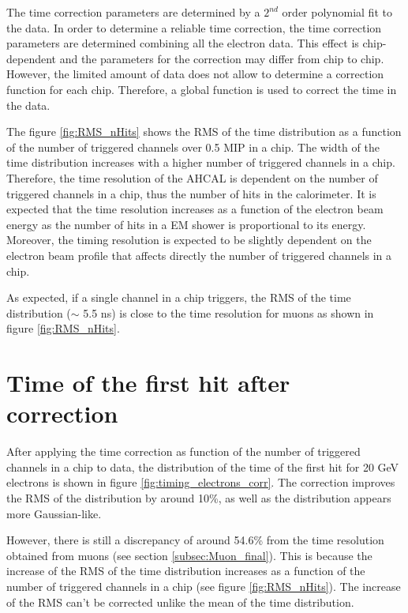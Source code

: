 The time correction parameters are determined by a $2^{nd}$ order polynomial fit to the data. In order to determine a reliable time correction, the time correction parameters are determined combining all the electron data. This effect is chip-dependent and the parameters for the correction may differ from chip to chip. However, the limited amount of data does not allow to determine a correction function for each chip. Therefore, a global function is used to correct the time in the data.

The figure \ref{fig:RMS_nHits} shows the RMS of the time distribution as a function of the number of triggered channels over 0.5 MIP in a chip. The width of the time distribution increases with a higher number of triggered channels in a chip. Therefore, the time resolution of the AHCAL is dependent on the number of triggered channels in a chip, thus the number of hits in the calorimeter. It is expected that the time resolution increases as a function of the electron beam energy as the number of hits in a EM shower is proportional to its energy. Moreover, the timing resolution is expected to be slightly dependent on the electron beam profile that affects directly the number of triggered channels in a chip.

As expected, if a single channel in a chip triggers, the RMS of the time distribution ($\sim$ 5.5 ns) is close to the time resolution for muons as shown in figure \ref{fig:RMS_nHits}.

\section{Time of the first hit after correction}
\label{subsec:Electron_Final}

After applying the time correction as function of the number of triggered channels in a chip to data, the distribution of the time of the first hit for 20 GeV electrons is shown in figure \ref{fig:timing_electrons_corr}. The correction improves the RMS of the distribution by around 10\%, as well as the distribution appears more Gaussian-like.

However, there is still a discrepancy of around 54.6\% from the time resolution obtained from muons (see section \ref{subsec:Muon_final}). This is because the increase of the RMS of the time distribution increases as a function of the number of triggered channels in a chip (see figure \ref{fig:RMS_nHits}). The increase of the RMS can't be corrected unlike the mean of the time distribution.


